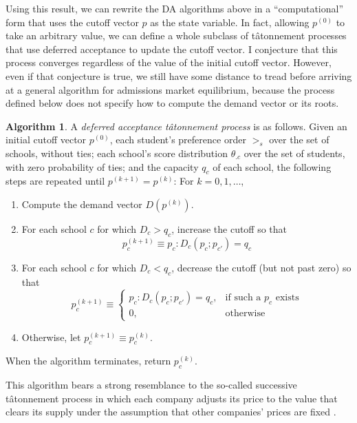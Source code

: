 \documentclass[12pt]{article}
\theoremstyle{definition}
\newtheorem{algorithm}{Algorithm}
\begin{document}
Using this result, we can rewrite the DA algorithms above in a ``computational'' form that uses the cutoff vector $p$ as the state variable. In fact, allowing $p^{(0)}$ to take an arbitrary value, we can define a whole subclass of t\^{a}tonnement processes that use deferred acceptance to update the cutoff vector. I conjecture that this process converges regardless of the value of the initial cutoff vector. However, even if that conjecture is true, we still have some distance to tread before arriving at a general algorithm for admissions market equilibrium, because the process defined below does not specify how to compute the demand vector or its roots.
\begin{algorithm}
A \emph{deferred acceptance t\^{a}tonnement process} is as follows. Given an initial cutoff vector $p^{(0)}$, each student's preference order $>_s$ over the set of schools, without ties;  each school's score distribution $\theta_{.c}$ over the set of students, with zero probability of ties; and the capacity $q_c$ of each school, the following steps are repeated until $p^{(k+1)} = p^{(k)}$: For $k = 0, 1, \dots$, 
\begin{enumerate}
\item Compute the demand vector $D (p^{(k)})$. 
\item For each school $c$ for which $D_c > q_c$, increase the cutoff so that
\[p_c^{(k+1)} \equiv p_c: D_c(p_c; p_{c'} ) = q_c\]
\item For each school $c$ for which $D_c < q_c$, decrease the cutoff (but not past zero) so that
\[p_c^{(k+1)} \equiv \begin{cases}
p_c: D_c(p_c; p_{c'} ) = q_c, &\text{if such a } p_c \text{ exists}\\
0, &\text{otherwise}
\end{cases}\]
\item Otherwise, let $p_c^{(k+1)} \equiv p_c^{(k)}$.
\end{enumerate}
When the algorithm terminates, return $p_c^{(k)}$. 
\end{algorithm}

This algorithm bears a strong resemblance to the so-called successive t\^{a}tonnement process in which each company adjusts its price to the value that clears its supply under the assumption that other companies' prices are fixed \parencite[see][eqn. 6]{walrastatonnement}. 
\end{document}
